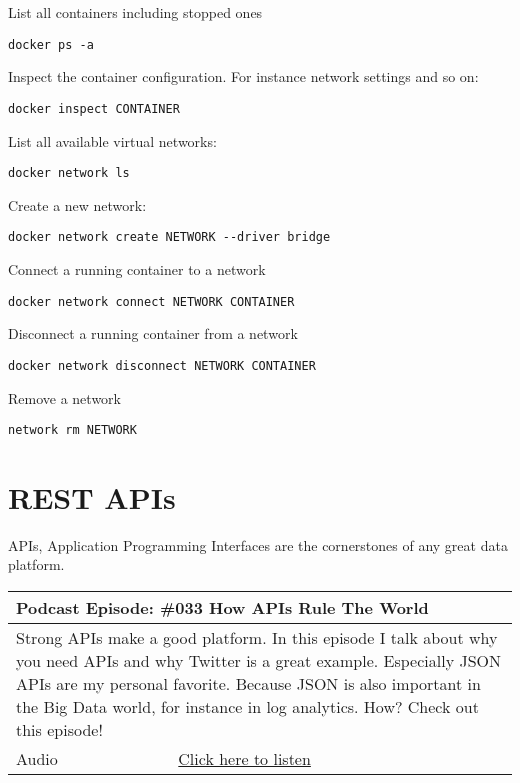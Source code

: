 \documentclass[12pt, numbers=noenddot]{scrreprt} %
\begin{document}
List all containers including stopped ones
\begin{lstlisting}
docker ps -a
\end{lstlisting}

Inspect the container configuration. For instance network settings and so on:
\begin{lstlisting}
docker inspect CONTAINER
\end{lstlisting}

List all available virtual networks:
\begin{lstlisting}
docker network ls
\end{lstlisting}

Create a new network:
\begin{lstlisting}
docker network create NETWORK --driver bridge
\end{lstlisting}

Connect a running container to a network
\begin{lstlisting}
docker network connect NETWORK CONTAINER
\end{lstlisting}

Disconnect a running container from a network
\begin{lstlisting}
docker network disconnect NETWORK CONTAINER
\end{lstlisting}

Remove  a network
\begin{lstlisting}
network rm NETWORK
\end{lstlisting}


\chapter{REST APIs}
APIs, Application Programming Interfaces are the cornerstones of any great data platform. 

\begin{table}[h]
\begin{tabular}{ll}
\hline
\multicolumn{2}{l}{\textbf{Podcast Episode:} \#033 How APIs Rule The World} \\ \hline
\multicolumn{2}{p{15cm}}{Strong APIs make a good platform. In this episode I talk about why you need APIs and why Twitter is a great example. Especially JSON APIs are my personal favorite. Because JSON is also important in the Big Data world, for instance in log analytics. How? Check out this episode!}         \\ \hline
\multicolumn{1}{l|}{Audio}     & \href{https://anchor.fm/andreaskayy/episodes/How-APIs-Rule-The-World--PoDS-033-e24ttq}{Click here to listen}   \\ \hline
\end{tabular}
\end{table}
\end{document}
